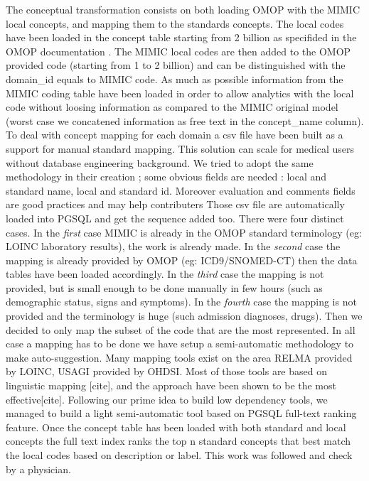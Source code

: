 The conceptual transformation consists on both loading OMOP with the MIMIC
local concepts, and mapping them to the standards concepts. 
The local codes have been loaded in the concept table starting from 2 billion
as specifided in the OMOP documentation \cite{omop-documentation-pdf}. The
MIMIC local codes are then added to the OMOP provided code (starting from 1 to
2 billion) and can be distinguished with the domain_id equals to MIMIC code. As
much as possible information from the MIMIC coding table have been loaded in
order to allow analytics with the local code without loosing information as
compared to the MIMIC original model (worst case we concatened information as
free text in the concept_name column).
To deal with concept mapping for each domain a csv file have been built as a
support for manual standard mapping. This solution can scale for medical users
without database engineering background. We tried to adopt the same methodology
in their creation ; some obvious fields are needed : local and standard name,
local and standard id. Moreover evaluation and comments fields are good
practices and may help contributers Those csv file are automatically loaded
into PGSQL and get the sequence added too. There were four distinct cases.  In the
\emph{first} case MIMIC is already in the OMOP standard terminology (eg: LOINC
laboratory results), the work is already made.  In the \emph{second} case the
mapping is already provided by OMOP (eg: ICD9/SNOMED-CT) then the data tables
have been loaded accordingly.  In the \emph{third} case the mapping is not
provided, but is small enough to be done manually in few hours (such as
demographic status, signs and symptoms).  In the \emph{fourth} case the mapping
is not provided and the terminology is huge (such admission diagnoses, drugs).
Then we decided to only map the subset of the code that are the most
represented.
In all case a mapping has to be done we have setup a semi-automatic methodology
to make auto-suggestion. Many mapping tools exist on the area RELMA provided by
LOINC, USAGI provided by OHDSI. Most of those tools are based on linguistic
mapping [cite], and the approach have been shown to be the most
effective[cite]. Following our prime idea to build low dependency tools, we
managed to build a light semi-automatic tool based on PGSQL full-text ranking
feature.  Once the concept table has been loaded with both standard and local
concepts the full text index ranks the top n standard concepts that best match
the local codes based on description or label.  This work was followed and
check by a physician.


